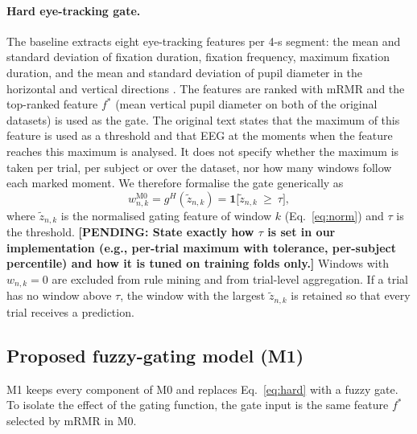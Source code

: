 \documentclass[11pt,a4paper]{article}
\newcommand{\pending}[1]{\textcolor{red!75!black}{\textbf{[PENDING: #1]}}}
\begin{document}
\paragraph{Hard eye-tracking gate.}
The baseline extracts eight eye-tracking features per 4-s segment: the mean and standard deviation of fixation duration, fixation frequency, maximum fixation duration, and the mean and standard deviation of pupil diameter in the horizontal and vertical directions \cite{FarhadiSedehi2024a}. The features are ranked with mRMR and the top-ranked feature $f^\ast$ (mean vertical pupil diameter on both of the original datasets) is used as the gate. The original text states that the maximum of this feature is used as a threshold and that EEG at the moments when the feature reaches this maximum is analysed. It does not specify whether the maximum is taken per trial, per subject or over the dataset, nor how many windows follow each marked moment. We therefore formalise the gate generically as
\begin{equation}
w^{\mathrm{M0}}_{n,k} = g^{H}(\tilde z_{n,k}) = \mathbf{1}\big[\tilde z_{n,k}\ \geq\ \tau\big],
\label{eq:hard}
\end{equation}
where $\tilde z_{n,k}$ is the normalised gating feature of window $k$ (Eq.~\eqref{eq:norm}) and $\tau$ is the threshold. \pending{State exactly how $\tau$ is set in our implementation (e.g., per-trial maximum with tolerance, per-subject percentile) and how it is tuned on training folds only.} Windows with $w_{n,k}=0$ are excluded from rule mining and from trial-level aggregation. If a trial has no window above $\tau$, the window with the largest $\tilde z_{n,k}$ is retained so that every trial receives a prediction.

\subsection{Proposed fuzzy-gating model (M1)}
M1 keeps every component of M0 and replaces Eq.~\eqref{eq:hard} with a fuzzy gate. To isolate the effect of the gating function, the gate input is the same feature $f^\ast$ selected by mRMR in M0.
\end{document}
